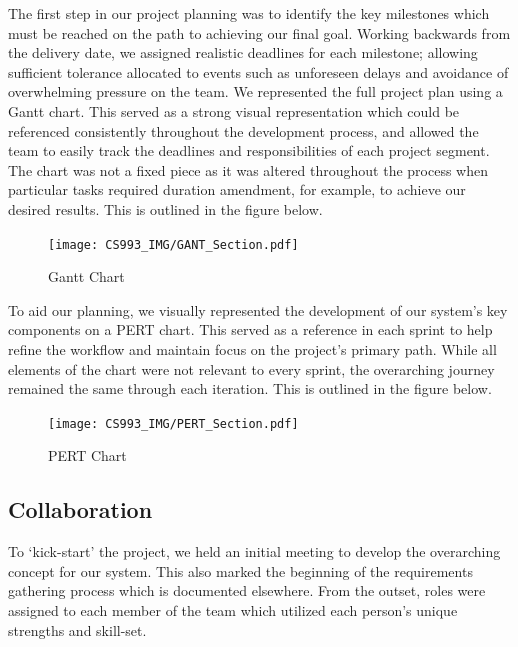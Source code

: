\documentclass[11pt, english]{article}
\begin{document}
	The first step in our project planning was to identify the key milestones which must be reached on the path to achieving our final goal. Working backwards from the delivery date, we assigned realistic deadlines for each milestone; allowing sufficient tolerance allocated to events such as unforeseen delays and avoidance of overwhelming pressure on the team. We represented the full project plan using a Gantt chart. This served as a strong visual representation which could be referenced consistently throughout the development process, and allowed the team to easily track the deadlines and responsibilities of each project segment. The chart was not a fixed piece as it was altered throughout the process when particular tasks required duration amendment, for example, to achieve our desired results. This is outlined in the figure below.

	\begin{figure}[H]
	\begin{center}
		\texttt{[image: CS993\_IMG/GANT\_Section.pdf]}
		\caption{Gantt Chart}
	\end{center}
	\end{figure}

	To aid our planning, we visually represented the development of our system's key components on a PERT chart. This served as a reference in each sprint to help refine the workflow and maintain focus on the project's primary path. While all elements of the chart were not relevant to every sprint, the overarching journey remained the same through each iteration. This is outlined in the figure below.

	\begin{figure}[H]
	\begin{center}
		\texttt{[image: CS993\_IMG/PERT\_Section.pdf]}
		\caption{PERT Chart}
	\end{center}
	\end{figure}

	\subsection{Collaboration}

	To `kick-start' the project, we held an initial meeting to develop the overarching concept for our system. This also marked the beginning of the requirements gathering process which is documented elsewhere. From the outset, roles were assigned to each member of the team which utilized each person's unique strengths and skill-set.\\
\end{document}
